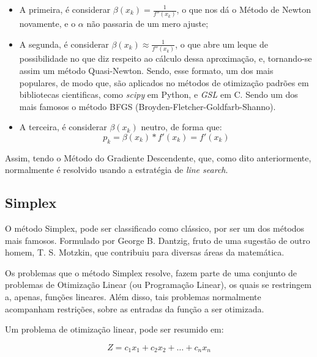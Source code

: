 \begin{itemize}

    \item A primeira, é considerar \(\beta(x_k) = \frac{1}{f''(x_k)}\), o que
        nos dá o Método de Newton novamente, e o \(\alpha\) não passaria de
        um mero ajuste;

    \item A segunda, é considerar
        \(\beta(x_k) \approx \frac{1}{f''(x_k)}\), o que abre um leque de
        possibilidade no que diz respeito ao cálculo dessa aproximação,
        e, tornando-se assim um método Quasi-Newton. Sendo, esse formato, um dos
        mais populares, de modo que, são aplicados no métodos de otimização
        padrões em bibliotecas cientificas, como \textit{scipy} em Python,
        e \textit{GSL} em C. Sendo um dos mais famosos o método BFGS
        (Broyden-Fletcher-Goldfarb-Shanno).

    \item A terceira, é considerar \(\beta(x_k) \) neutro, de forma que:
        \begin{equation}
            p_k = \beta(x_k) * f'(x_k) = f'(x_k)
        \end{equation}

\end{itemize}

Assim, tendo o Método do Gradiente Descendente, que, como dito anteriormente,
normalmente é resolvido usando a estratégia de \textit{line search}.


\subsection{Simplex}

\hspace{0.8cm}
O método Simplex, pode ser classificado como clássico, por ser um
dos métodos mais famosos. Formulado por George B. Dantzig, fruto de uma
sugestão de outro homem, T. S. Motzkin, que contribuiu para diversas áreas da
matemática.

Os problemas que o método Simplex resolve, fazem parte de uma conjunto de
problemas de Otimização Linear (ou Programação Linear), os quais se restringem
a, apenas, funções lineares. Além disso, tais problemas normalmente acompanham
restrições, sobre as entradas da função a ser otimizada.

Um problema de otimização linear, pode ser resumido em:

\begin{equation}
        Z = c_1x_1 + c_2x_2 + … + c_nx_n
\end{equation}

